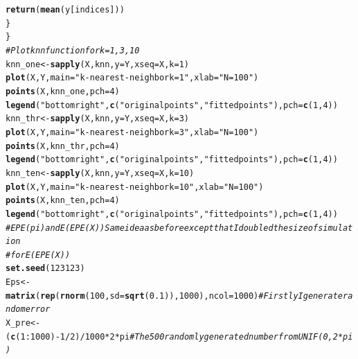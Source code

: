 \documentclass{article}\usepackage[]{graphicx}\usepackage[]{color}
\makeatletter
\newcommand{\hlnum}[1]{\textcolor[rgb]{0.686,0.059,0.569}{#1}}%
\newcommand{\hlstr}[1]{\textcolor[rgb]{0.192,0.494,0.8}{#1}}%
\newcommand{\hlcom}[1]{\textcolor[rgb]{0.678,0.584,0.686}{\textit{#1}}}%
\newcommand{\hlopt}[1]{\textcolor[rgb]{0,0,0}{#1}}%
\newcommand{\hlstd}[1]{\textcolor[rgb]{0.345,0.345,0.345}{#1}}%
\newcommand{\hlkwb}[1]{\textcolor[rgb]{0.69,0.353,0.396}{#1}}%
\newcommand{\hlkwc}[1]{\textcolor[rgb]{0.333,0.667,0.333}{#1}}%
\newcommand{\hlkwd}[1]{\textcolor[rgb]{0.737,0.353,0.396}{\textbf{#1}}}%
\newenvironment{kframe}{%
 \def\at@end@of@kframe{}%
 \ifinner\ifhmode%
  \def\at@end@of@kframe{\end{minipage}}%
  \begin{minipage}{\columnwidth}%
 \fi\fi%
 \def\FrameCommand##1{\hskip\@totalleftmargin \hskip-\fboxsep
 \colorbox{shadecolor}{##1}\hskip-\fboxsep
     \hskip-\linewidth \hskip-\@totalleftmargin \hskip\columnwidth}%
 \MakeFramed {\advance\hsize-\width
   \@totalleftmargin\z@ \linewidth\hsize
   \@setminipage}}%
 {\par\unskip\endMakeFramed%
 \at@end@of@kframe}
\newenvironment{knitrout}{}{} %
\makeatother
\begin{document}
\begin{knitrout}
\begin{kframe}
\begin{alltt}
        \hlkwd{return}\hlstd{(}\hlkwd{mean}\hlstd{(y[indices]))}
    \hlstd{\}}
\hlstd{\}}
\hlcom{# Plot knn function for k = 1,3,10}
\hlstd{knn_one} \hlkwb{<-} \hlkwd{sapply}\hlstd{(X, knn,} \hlkwc{y} \hlstd{= Y,} \hlkwc{xseq} \hlstd{= X,} \hlkwc{k} \hlstd{=} \hlnum{1}\hlstd{)}
\hlkwd{plot}\hlstd{(X, Y,} \hlkwc{main} \hlstd{=} \hlstr{"k-nearest-neighbor k = 1"}\hlstd{,} \hlkwc{xlab} \hlstd{=} \hlstr{"N = 100"}\hlstd{)}
\hlkwd{points}\hlstd{(X, knn_one,} \hlkwc{pch} \hlstd{=} \hlnum{4}\hlstd{)}
\hlkwd{legend}\hlstd{(}\hlstr{"bottomright"}\hlstd{,} \hlkwd{c}\hlstd{(}\hlstr{"original points"}\hlstd{,} \hlstr{"fitted points"}\hlstd{),} \hlkwc{pch} \hlstd{=} \hlkwd{c}\hlstd{(}\hlnum{1}\hlstd{,} \hlnum{4}\hlstd{))}
\hlstd{knn_thr} \hlkwb{<-} \hlkwd{sapply}\hlstd{(X, knn,} \hlkwc{y} \hlstd{= Y,} \hlkwc{xseq} \hlstd{= X,} \hlkwc{k} \hlstd{=} \hlnum{3}\hlstd{)}
\hlkwd{plot}\hlstd{(X, Y,} \hlkwc{main} \hlstd{=} \hlstr{"k-nearest-neighbor k = 3"}\hlstd{,} \hlkwc{xlab} \hlstd{=} \hlstr{"N = 100"}\hlstd{)}
\hlkwd{points}\hlstd{(X, knn_thr,} \hlkwc{pch} \hlstd{=} \hlnum{4}\hlstd{)}
\hlkwd{legend}\hlstd{(}\hlstr{"bottomright"}\hlstd{,} \hlkwd{c}\hlstd{(}\hlstr{"original points"}\hlstd{,} \hlstr{"fitted points"}\hlstd{),} \hlkwc{pch} \hlstd{=} \hlkwd{c}\hlstd{(}\hlnum{1}\hlstd{,} \hlnum{4}\hlstd{))}
\hlstd{knn_ten} \hlkwb{<-} \hlkwd{sapply}\hlstd{(X, knn,} \hlkwc{y} \hlstd{= Y,} \hlkwc{xseq} \hlstd{= X,} \hlkwc{k} \hlstd{=} \hlnum{10}\hlstd{)}
\hlkwd{plot}\hlstd{(X, Y,} \hlkwc{main} \hlstd{=} \hlstr{"k-nearest-neighbor k = 10"}\hlstd{,} \hlkwc{xlab} \hlstd{=} \hlstr{"N = 100"}\hlstd{)}
\hlkwd{points}\hlstd{(X, knn_ten,} \hlkwc{pch} \hlstd{=} \hlnum{4}\hlstd{)}
\hlkwd{legend}\hlstd{(}\hlstr{"bottomright"}\hlstd{,} \hlkwd{c}\hlstd{(}\hlstr{"original points"}\hlstd{,} \hlstr{"fitted points"}\hlstd{),} \hlkwc{pch} \hlstd{=} \hlkwd{c}\hlstd{(}\hlnum{1}\hlstd{,} \hlnum{4}\hlstd{))}
\hlcom{# EPE(pi) and E(EPE(X)) Same idea as before except that I doubled the size of simulation}
\hlcom{# for E(EPE(X))}
\hlkwd{set.seed}\hlstd{(}\hlnum{123123}\hlstd{)}
\hlstd{Eps} \hlkwb{<-} \hlkwd{matrix}\hlstd{(}\hlkwd{rep}\hlstd{(}\hlkwd{rnorm}\hlstd{(}\hlnum{100}\hlstd{,} \hlkwc{sd} \hlstd{=} \hlkwd{sqrt}\hlstd{(}\hlnum{0.1}\hlstd{)),} \hlnum{1000}\hlstd{),} \hlkwc{ncol} \hlstd{=} \hlnum{1000}\hlstd{)}  \hlcom{# Firstly I generate random error}
\hlstd{X_pre} \hlkwb{<-} \hlstd{(}\hlkwd{c}\hlstd{(}\hlnum{1}\hlopt{:}\hlnum{1000}\hlstd{)} \hlopt{-} \hlnum{1}\hlopt{/}\hlnum{2}\hlstd{)}\hlopt{/}\hlnum{1000} \hlopt{*} \hlnum{2} \hlopt{*} \hlstd{pi}  \hlcom{# The 500 randomly generated number from        UNIF(0, 2*pi)}

\end{alltt}
\end{kframe}
\end{knitrout}
\end{document}
